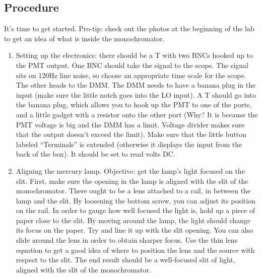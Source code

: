 \documentclass{../lab}
\begin{document}
\subsection{Procedure}

It's time to get started. Pro-tip: check out the photos at the beginning of the lab to get an idea of what is inside the monochromator.

\begin{enumerate}
    \item Setting up the electronics: there should be a T with two BNCs hooked up to the PMT output. One BNC should take the signal to the scope. The signal sits on 120Hz line noise, so choose an appropriate time scale for the scope. The other heads to the DMM. The DMM needs to have a banana plug in the input (make sure the little notch goes into the LO input). A T should go into the banana plug, which allows you to hook up the PMT to one of the ports, and a little gadget with a resistor onto the other port (Why? It is because the PMT voltage is big and the DMM has a limit. Voltage divider makes sure that the output doesn't exceed the limit). Make sure that the little button labeled ``Terminals'' is extended (otherwise it displays the input from the back of the box). It should be set to read volts DC.

    \item Aligning the mercury lamp. Objective: get the lamp's light focused on the slit. First, make sure the opening in the lamp is aligned with the slit of the monochromator. There ought to be a lens attached to a rail, in between the lamp and the slit. By loosening the bottom screw, you can adjust its position on the rail. In order to gauge how well focused the light is, hold up a piece of paper close to the slit. By moving around the lamp, the light should change its focus on the paper. Try and line it up with the slit opening. You can also slide around the lens in order to obtain sharper focus. Use the thin lens equation to get a good idea of where to position the lens and the source with respect to the slit. The end result should be a well-focused slit of light, aligned with the slit of the monochromator.
    

\end{enumerate}
\end{document}
